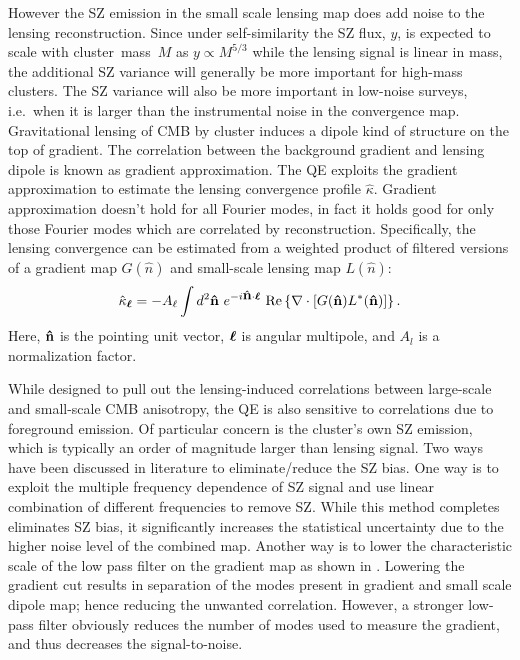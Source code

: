 However the SZ emission in the small scale lensing map does add noise to the lensing reconstruction. 
Since under self-similarity the SZ flux, $y$, is expected to scale with  \mbox{cluster mass $M$} as $y \propto M^{5/3}$ while the lensing signal is linear in mass, the additional SZ variance will generally be more important for high-mass clusters. 
The SZ variance will also be more important in low-noise surveys, i.e.~when it is larger than the instrumental noise in the convergence map.%
 Gravitational lensing of CMB by cluster induces a dipole kind of structure on the top of gradient.
 The correlation between the background gradient and lensing dipole is known as gradient approximation.    
The QE \citep{hu02a} exploits the gradient approximation to estimate the lensing convergence profile $\hat{\kappa}$. 
 Gradient approximation doesn't hold for all Fourier modes, in fact it holds good for only those Fourier modes which are correlated by reconstruction. 
 Specifically, the lensing convergence can be estimated from a weighted product of filtered versions of a gradient map $G(\hat{n})$ and  small-scale lensing map $L(\hat{n})$: 
\begin{equation}
\hat{\kappa}_{\bm{\ell}} =-A_{\ell}\int d^{2}\bm{\hat{\mbox{n}}}\ e^{-i\bm{\hat{\mbox{n}}}\cdot\bm{\ell}}\ {\rm Re} \left\{ \nabla \cdot \left[ G(\bm{\hat{\mbox{n}}}) L^{*}(\bm{\hat{\mbox{n}}})\right]\right\}.
\label{eq_QE_kappa}
\end{equation} 
Here, $\bm{\hat{\mbox{n}}}$ is the pointing unit vector, $\bm{\ell}$ is angular multipole, and $A_{l}$ is a normalization factor. 

While designed to pull out the lensing-induced correlations between large-scale and small-scale CMB anisotropy, the QE is also sensitive to  correlations due to foreground emission.
Of particular concern is  the cluster's own SZ emission, which is typically an order of magnitude larger than lensing signal. 
Two ways have been discussed in literature to eliminate/reduce the SZ bias.
One way is to exploit the multiple frequency dependence of SZ signal and use linear combination of different frequencies to remove SZ.
While this method completes eliminates SZ bias, it significantly increases the statistical uncertainty due to the higher noise level of the combined map.
Another way is to lower the characteristic scale of the low pass filter on the gradient map as shown in  \citet{hu07}.
Lowering the gradient cut results in separation of the modes present in gradient and small scale dipole map; hence reducing the unwanted correlation. 
However, a stronger low-pass filter obviously reduces the number of modes used to measure the gradient, and thus decreases the signal-to-noise. 

